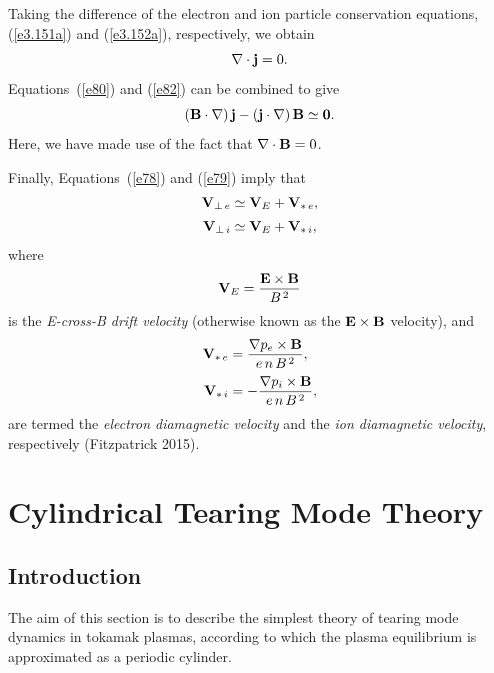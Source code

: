 \documentclass[notitlepage,12pt]{article}
\begin{document}
 Taking the difference of the electron and ion particle
conservation equations, (\ref{e3.151a}) and (\ref{e3.152a}), respectively, we obtain
\begin{equation}\label{e82}
\nabla\cdot {\bf j} = 0.
\end{equation}
 Equations~(\ref{e80}) and (\ref{e82}) can be combined to give
\begin{equation}\label{e84}
({\bf B}\cdot\nabla)\,{\bf j } - ({\bf j}\cdot\nabla)\,{\bf B} \simeq {\bf 0}.
\end{equation}
Here, we have made use of the fact that $\nabla\cdot{\bf B}=0$. 

Finally, Equations~(\ref{e78}) and (\ref{e79}) imply that
\begin{align}
{\bf V}_{\perp\,e} &\simeq {\bf V}_E + {\bf V}_{\ast\,e},\\[0.5ex]
{\bf V}_{\perp\,i} &\simeq {\bf V}_E + {\bf V}_{\ast\,i},
\end{align}
where
\begin{equation}
{\bf V}_E = \frac{{\bf E}\times {\bf B}}{B^{\,2}}
\end{equation}
is the {\em E-cross-B drift velocity}\/ (otherwise known as  the ${\bf E}\times {\bf B}$ velocity), and
\begin{align}
{\bf V}_{\ast\,e}&= \frac{\nabla p_e\times {\bf B}}{e\,n\,B^{\,2}},\\[0.5ex]
{\bf V}_{\ast\,i}&=- \frac{\nabla p_i\times {\bf B}}{e\,n\,B^{\,2}},
\end{align}
are termed the {\em electron diamagnetic velocity}\/ and the {\em ion diamagnetic velocity}, respectively (Fitzpatrick 2015). 

\section{Cylindrical Tearing Mode Theory}\label{cyl}
\subsection{Introduction}
The aim of this section is to describe the simplest theory of tearing mode dynamics in tokamak plasmas, according to which the plasma
equilibrium is approximated as a periodic cylinder. 
\end{document}
